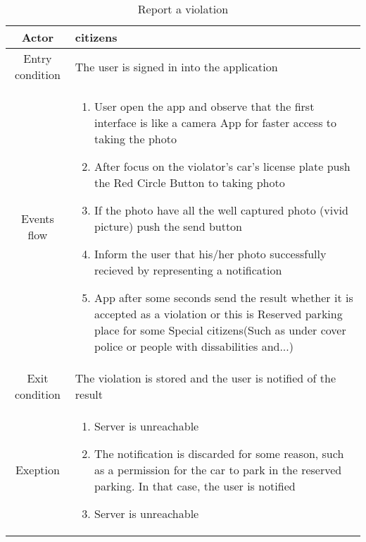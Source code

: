 \documentclass{article}
\begin{document}
		\begin{table} [H]
		\begin{center}
		\caption{Report a violation}
		\begin{tabular}{|c|p{8cm}|}
			\hline
			Actor&citizens\\
			\hline
			Entry condition&The user is signed in into the application\\
			\hline
			 Events flow& \begin{enumerate}
							\item User open the app and observe that the first interface is like a camera App for faster access to taking the photo			
							\item After focus on the violator's car's license plate push the Red Circle Button to taking photo
							\item If the photo have all the well captured photo (vivid picture) push the send button
							\item Inform the user that his/her photo successfully recieved by representing a notification
							\item App after some seconds send the result whether it is accepted as a violation or this is Reserved parking place for some Special citizens(Such as under cover police or people with dissabilities and...)
						\end{enumerate}\\
			\hline
			Exit condition& The violation is stored and the user is notified of the result\\
			\hline
			Exeption& \begin{enumerate}
						\item Server is unreachable
						\item The notification is discarded for some reason, such as a permission for the car to park in the reserved parking. In that case, the user is notified
						\item Server is unreachable
					\end{enumerate}\\
			\hline
		\end{tabular}
		\end{center}
		\end{table} 
		
\end{document}
